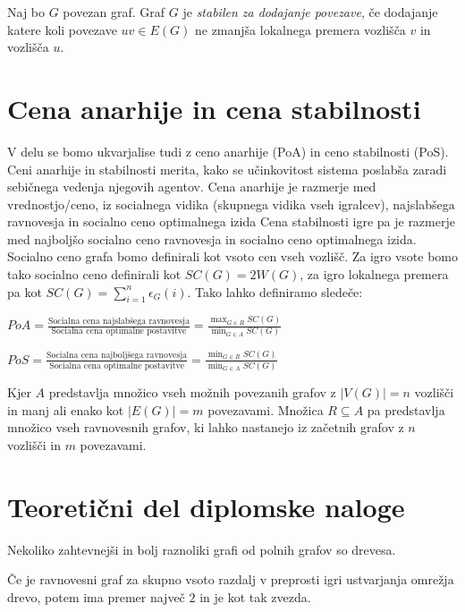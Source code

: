 \documentclass[fin1, tisk]{fmfdelo}
\begin{document}
\begin{definicija}
Naj bo $G$ povezan graf. Graf $G$ je \textit{stabilen za dodajanje povezave},
če dodajanje katere koli povezave $uv \in E(G)$ ne zmanjša lokalnega premera vozlišča $v$ in vozlišča $u$.
\end{definicija}

\section{Cena anarhije in cena stabilnosti}
V delu se bomo ukvarjalise tudi z ceno anarhije (PoA) in ceno stabilnosti (PoS).
Ceni anarhije in stabilnosti merita, kako se učinkovitost sistema poslabša zaradi sebičnega vedenja njegovih agentov.
Cena anarhije je razmerje med vrednostjo/ceno, iz socialnega vidika (skupnega vidika vseh igralcev), najslabšega ravnovesja in socialno ceno optimalnega izida
Cena stabilnosti igre pa je razmerje med najboljšo socialno ceno ravnovesja in socialno ceno optimalnega izida.\\
Socialno ceno grafa bomo definirali kot vsoto cen vseh vozlišč. Za igro vsote bomo tako socialno ceno definirali kot $SC(G) = 2W(G)$,
za igro lokalnega premera pa kot $SC(G) = \sum_{i=1}^{n}\epsilon_G(i)$.
Tako lahko definiramo sledeče:
\begin{definicija}
$PoA = \frac{\text{Socialna cena najslabšega ravnovesja}}{\text{Socialna cena optimalne postavitve}} = \frac{\max_{G\in R} SC(G)}{\min_{G\in A} SC(G)}$
\end{definicija}
\begin{definicija}
$PoS = \frac{\text{Socialna cena najboljšega ravnovesja}}{\text{Socialna cena optimalne postavitve}} = \frac{\min_{G\in R} SC(G)}{\min_{G\in A} SC(G)}$
\end{definicija}
Kjer $A$ predstavlja množico vseh možnih povezanih grafov z $|V(G)| = n$ vozlišči in manj ali enako kot $|E(G)| = m$ povezavami.
Množica $R \subseteq A$ pa predstavlja množico vseh ravnovesnih grafov, ki lahko nastanejo iz začetnih grafov z $n$ vozlišči in $m$ povezavami.





\section{Teoretični del diplomske naloge}

Nekoliko zahtevnejši in bolj raznoliki grafi od polnih grafov so drevesa.

\begin{izrek}
Če je ravnovesni graf za skupno vsoto razdalj v preprosti igri ustvarjanja
omrežja drevo, potem ima premer največ $2$ in je kot tak zvezda.
\end{izrek}
\end{document}
